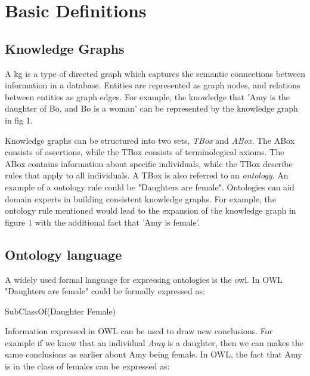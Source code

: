 \chapter{Basic Definitions}


\section{Knowledge Graphs}
A \gls{kg} is a type of directed graph which captures the semantic connections between information in a database. Entities are represented as graph nodes, and relations between entities as graph edges. For example, the knowledge that 'Amy is the daughter of Bo, and Bo is a woman' can be represented by the knowledge graph in fig 1.


 Knowledge graphs can be structured into two sets, \emph{TBox} and \emph{ABox}. The ABox consists of assertions, while the TBox consists of terminological axioms. The ABox contains information about specific individuals, while the TBox describe rules that apply to all individuals. A TBox is also referred to an \emph{ontology}. An example of a ontology rule could be "Daughters are female". Ontologies can aid domain experts in building consistent knowledge graphs. For example, the ontology rule mentioned would lead to the expansion of the knowledge graph in figure 1 with the additional fact that 'Amy is female'.

\section{Ontology language}
A widely used formal language for expressing ontologies is the \gls{owl}. In OWL "Daughters are female" could be formally expressed as:

\centerline{\textsf{SubClassOf(Daughter Female)}}
Information expressed in OWL can be used to draw new conclusions. For example if we know that an individual \emph{Amy} is a daughter, then we can makes the same conclusions as earlier about Amy being female. In OWL, the fact that Amy is in the class of females can be expressed as:

